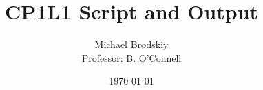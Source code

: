 


\title{CP1L1 Script and Output}
\date{\today}
\author{Michael Brodskiy\\ \small Professor: B. O'Connell}



\maketitle









